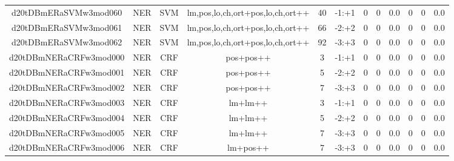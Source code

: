 \documentclass[a4paper]{article}
\begin{document}
\begin{landscape}
\begin{center}
\begin{tabular}{ |c|c|c|c|c|c|c|c|c|c|c|c|}
 
 	
 	\small{ d20tDBmERaSVMw3mod060 } & \small{ NER} & \small{  SVM }  & lm,pos,lo,ch,ort+pos,lo,ch,ort++  &  40 &  \small{  -1:+1 }  &  0 & 0 & 0.0  &  0 & 0 & 0.0 \\
 	

 
 	
 	\small{ d20tDBmERaSVMw3mod061 } & \small{ NER} & \small{  SVM }  & lm,pos,lo,ch,ort+pos,lo,ch,ort++  &  66 &  \small{  -2:+2 }  &  0 & 0 & 0.0  &  0 & 0 & 0.0 \\
 	

 
 	
 	\small{ d20tDBmERaSVMw3mod062 } & \small{ NER} & \small{  SVM }  & lm,pos,lo,ch,ort+pos,lo,ch,ort++  &  92 &  \small{  -3:+3 }  &  0 & 0 & 0.0  &  0 & 0 & 0.0 \\
 	

 
 	
 	\small{ d20tDBmNERaCRFw3mod000 } & \small{ NER} & \small{  CRF }  & pos+pos++  &  3 &  \small{  -1:+1 }  &  0 & 0 & 0.0  &  0 & 0 & 0.0 \\
 	

 
 	
 	\small{ d20tDBmNERaCRFw3mod001 } & \small{ NER} & \small{  CRF }  & pos+pos++  &  5 &  \small{  -2:+2 }  &  0 & 0 & 0.0  &  0 & 0 & 0.0 \\
 	

 
 	
 	\small{ d20tDBmNERaCRFw3mod002 } & \small{ NER} & \small{  CRF }  & pos+pos++  &  7 &  \small{  -3:+3 }  &  0 & 0 & 0.0  &  0 & 0 & 0.0 \\
 	

 
 	
 	\small{ d20tDBmNERaCRFw3mod003 } & \small{ NER} & \small{  CRF }  & lm+lm++  &  3 &  \small{  -1:+1 }  &  0 & 0 & 0.0  &  0 & 0 & 0.0 \\
 	

 
 	
 	\small{ d20tDBmNERaCRFw3mod004 } & \small{ NER} & \small{  CRF }  & lm+lm++  &  5 &  \small{  -2:+2 }  &  0 & 0 & 0.0  &  0 & 0 & 0.0 \\
 	

 
 	
 	\small{ d20tDBmNERaCRFw3mod005 } & \small{ NER} & \small{  CRF }  & lm+lm++  &  7 &  \small{  -3:+3 }  &  0 & 0 & 0.0  &  0 & 0 & 0.0 \\
 	

 
 	
 	\small{ d20tDBmNERaCRFw3mod006 } & \small{ NER} & \small{  CRF }  & lm+pos++  &  7 &  \small{  -3:+3 }  &  0 & 0 & 0.0  &  0 & 0 & 0.0 \\
 	


\end{tabular}
\end{center}
\end{landscape}
\end{document}

